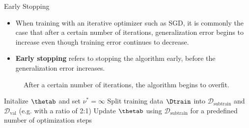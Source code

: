 







\begin{vbframe}{Early Stopping}
  
  \begin{itemize}
    \item When training with an iterative optimizer such as SGD, it is commonly the case that after a certain number of iterations, generalization error begins to increase even though training error continues to decrease.     
    \item \textbf{Early stopping} refers to stopping the algorithm early, before the generalization error increases.
  \end{itemize}
  \begin{figure}
    \centering
      \caption{After a certain number of iterations, the algorithm begins to overfit.}
  \end{figure}
\framebreak
   \begin{algorithm}[H]
  \footnotesize
  \caption{Early Stopping}
    \begin{algorithmic}[1]
      \State Initalize $\thetab$ and set $\nu^* = \infty$
      \State Split training data $\Dtrain$ into $\mathcal{D}_{\text{subtrain}}$ and $\mathcal{D}_{\text{val}}$ (e.g. with a ratio of 2:1)
        \State Update $\thetab$ using $\mathcal{D}_{\text{subtrain}}$ for a predefined number of optimization steps

\end{algorithmic}
\end{algorithm}
\end{vbframe}

